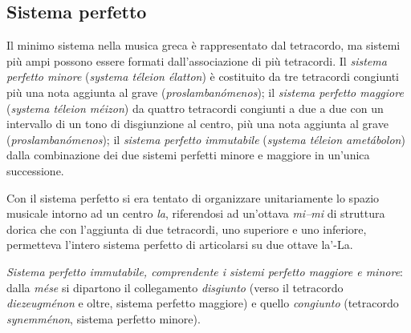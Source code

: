 \newpage

\subsection{Sistema perfetto}

Il minimo sistema nella musica greca è rappresentato dal tetracordo, ma
sistemi più ampi possono essere formati dall'associazione di più tetracordi.
Il \emph{sistema perfetto minore} (\emph{systema téleion élatton}) è
costituito da tre tetracordi congiunti più una nota aggiunta al grave
(\emph{proslambanómenos}); il \emph{sistema perfetto maggiore} (\emph{systema
téleion méizon}) da quattro tetracordi congiunti a due a due con un intervallo
di un tono di disgiunzione al centro, più una nota aggiunta al grave
(\emph{proslambanómenos}); il \emph{sistema perfetto immutabile} (\emph{systema
téleion ametábolon}) dalla combinazione dei due sistemi perfetti minore e
maggiore in un'unica successione.

Con il sistema perfetto si era tentato di organizzare unitariamente lo spazio
musicale intorno ad un centro \emph{la}, riferendosi ad un'ottava \emph{mi--mi}
di struttura dorica che con l'aggiunta di due tetracordi, uno superiore e uno inferiore, permetteva
l'intero sistema perfetto di articolarsi su due ottave la'-La.

\newpage

\textit{Sistema perfetto immutabile, comprendente i sistemi perfetto maggiore
e minore}: dalla \emph{mése} si dipartono il collegamento \emph{disgiunto}
(verso il tetracordo \emph{diezeugménon} e oltre, sistema perfetto maggiore) e
quello \emph{congiunto} (tetracordo \emph{synemménon}, sistema perfetto
minore).


